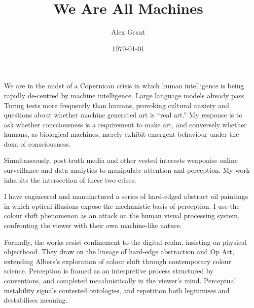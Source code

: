\documentclass[12pt]{article}
\title{We Are All Machines}
\author{Alex Grant}
\date{\today}
\begin{document}
\onehalfspacing
\maketitle

We are in the midst of a Copernican crisis in which human intelligence is
being rapidly de-centred by machine intelligence. Large language
models already pass Turing tests more frequently than
humans\autocite{jones2025largelanguagemodelspass,turing1950,feather2025brainmodelevaluationsneedneuroai},
provoking cultural anxiety and questions about whether machine
generated art is ``real art.'' My response is to ask whether
consciousness is a requirement to make art, and conversely whether
humans, as biological machines, merely exhibit emergent behaviour
under the doxa of consciousness.

Simultaneously,
post-truth\autocite{keyes2004posttruth,mcintyre2018posttruth} media and
other vested interests weaponise online surveillance and data
analytics to manipulate attention and
perception\autocite{zuboff2019surveillance,steyerl2016sea}. My work
inhabits the intersection of these two crises.

I have engineered and manufactured a series of hard-edged abstract oil
paintings in which optical illusions expose the mechanistic basis of
perception. I use the colour shift phenomenon as an attack on the
human visual processing system, confronting the viewer with their own
machine-like nature.

Formally, the works resist confinement to the digital
realm\autocite{zylinska2020ai,steyerl2017duty}, insisting on physical
objecthood\autocite{fontana1947spatial,merleauponty1964eye}. They draw on
the lineage of hard-edge
abstraction\autocite{Greenberg1961,Alloway1975,Judd1965,Fried1968,Follin2004EmbodiedVisions}
and Op Art\autocite{Riley2019EyesMind,Seitz1965ResponsiveEye}, extending
Albers’s exploration of colour shift\autocite{albers} through contemporary
colour
science\autocite{HurvichJameson1957,Land1977,SchnapfKraftBaylor1987}. Perception
is framed as an interpretive process structured by
conventions\autocite{popper1972objective,gombrich1960art}, and completed
mecahnistically in the viewer's
mind\autocite{merleauPonty1962phenomenology,barthes1977death,evertz09documentary}. Perceptual
instability signals contested ontologies\autocite{kuhn1970structure}, and
repetition both
legitimises\autocite{benjamin1935kunstwerk,arendt1972lying,hasher1977frequency}
and destabilises meaning\autocite{zuboff2019surveillance}.
\end{document}
